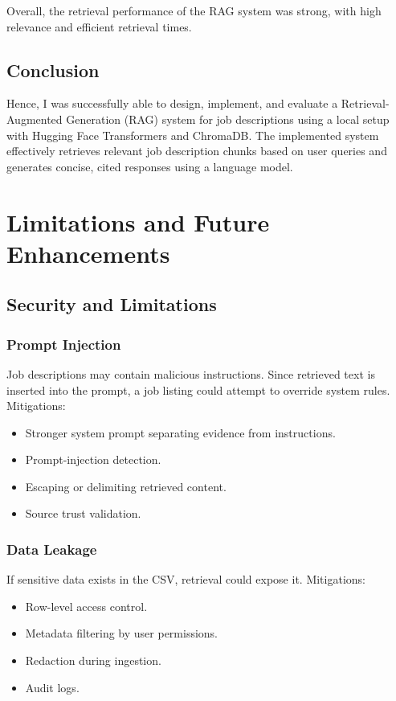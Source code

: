 ﻿\documentclass{article}
\begin{document}
Overall, the retrieval performance of the RAG system was strong, with high relevance and efficient retrieval times.

\subsection{Conclusion}
Hence, I was successfully able to design, implement, and evaluate a Retrieval-Augmented Generation (RAG) system for job descriptions using a local setup with Hugging Face Transformers and ChromaDB. 
The implemented system effectively retrieves relevant job description chunks based on user queries and generates concise, cited responses using a language model.

\section{Limitations and Future Enhancements}

\subsection{Security and Limitations}

\subsubsection{Prompt Injection}
Job descriptions may contain malicious instructions. Since retrieved text is inserted into the prompt, a job listing could attempt to override system rules. Mitigations:
\begin{itemize}
	\item Stronger system prompt separating evidence from instructions.
	\item Prompt-injection detection.
	\item Escaping or delimiting retrieved content.
	\item Source trust validation.
\end{itemize}

\subsubsection{Data Leakage}
If sensitive data exists in the CSV, retrieval could expose it. Mitigations:
\begin{itemize}
	\item Row-level access control.
	\item Metadata filtering by user permissions.
	\item Redaction during ingestion.
	\item Audit logs.
\end{itemize}
\end{document}
